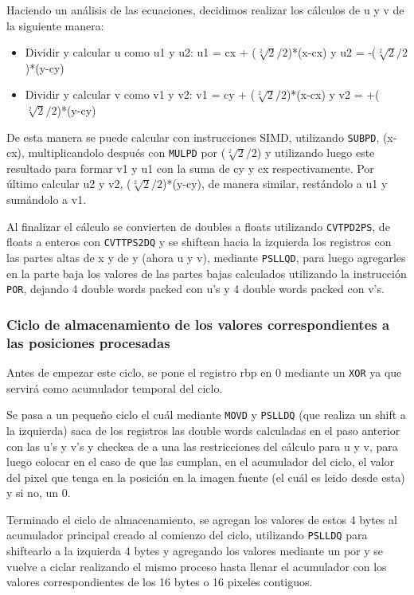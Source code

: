 Haciendo un análisis de las ecuaciones, decidimos realizar los cálculos de u y v de la siguiente manera:
\begin{itemize}
\item Dividir y calcular u como u1 y u2: u1 = cx + ($\sqrt[2]{2}/2$)*(x-cx) y u2 = -($\sqrt[2]{2}/2$)*(y-cy)
\item Dividir y calcular v como v1 y v2: v1 = cy + ($\sqrt[2]{2}/2$)*(x-cx) y v2 = +($\sqrt[2]{2}/2$)*(y-cy)
\end{itemize}

De esta manera se puede calcular con instrucciones SIMD, utilizando \texttt{SUBPD}, (x-cx), multiplicandolo después con \texttt{MULPD} por ($\sqrt[2]{2}/2$) y utilizando luego este resultado para formar v1 y u1 con la suma de cy y cx respectivamente. Por último calcular u2 y v2, ($\sqrt[2]{2}/2$)*(y-cy), de manera similar, restándolo a u1 y sumándolo a v1.

Al finalizar el cálculo se convierten de doubles a floats utilizando \texttt{CVTPD2PS}, de floats a enteros con \texttt{CVTTPS2DQ} y se shiftean hacia la izquierda los registros con las partes altas de x y de y (ahora u y v), mediante \texttt{PSLLQD}, para luego agregarles en la parte baja los valores de las partes bajas calculados utilizando la instrucción \texttt{POR}, dejando 4 double words packed con u's y 4 double words packed con v's.

\subsubsection{Ciclo de almacenamiento de los valores correspondientes a las posiciones procesadas}
Antes de empezar este ciclo, se pone el registro rbp en 0 mediante un \texttt{XOR} ya que servirá como acumulador temporal del ciclo.

Se pasa a un pequeño ciclo el cuál mediante \texttt{MOVD} y \texttt{PSLLDQ} (que realiza un shift a la izquierda) saca de los registros las double words calculadas en el paso anterior con las u's y v's y checkea de a una las restricciones del cálculo para u y v, para luego colocar en el caso de que las cumplan, en el acumulador del ciclo, el valor del pixel que tenga en la posición en la imagen fuente (el cuál es leido desde esta) y si no, un 0.

Terminado el ciclo de almacenamiento, se agregan los valores de estos 4 bytes al acumulador principal creado al comienzo del ciclo, utilizando \texttt{PSLLDQ} para shiftearlo a la izquierda 4 bytes y agregando los valores mediante un por y se vuelve a ciclar realizando el mismo proceso hasta llenar el acumulador con los valores correspondientes de los 16 bytes o 16 pixeles contiguos.

